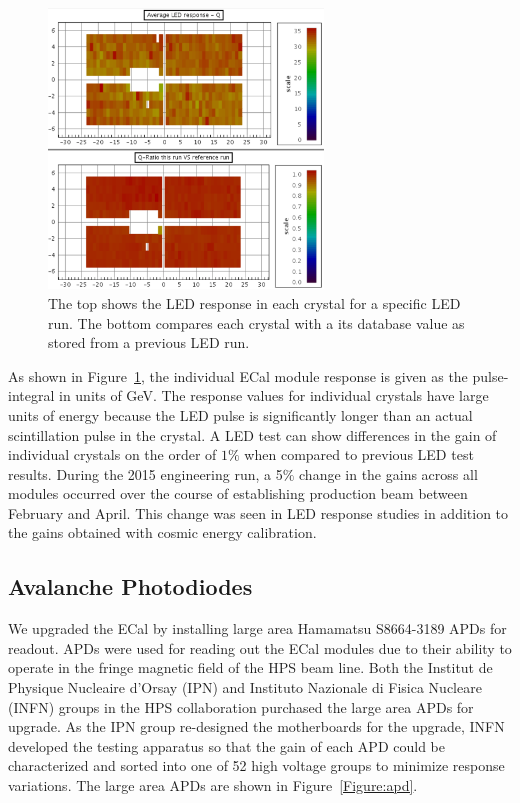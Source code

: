 \begin{figure}[htb]
  \centering
      \includegraphics[width=0.65\textwidth]{pics/experiment/ledCompare.png}
  \caption[Results of a single LED run]{The top shows the LED response in each crystal for a specific LED run. The bottom compares each crystal with a its database value as stored from a previous LED run.}
  \label{Figure:redCompare}
\end{figure}
As shown in Figure~\ref{Figure:redCompare}, the individual ECal module response is given as the pulse-integral in units of GeV. The response values for individual crystals have large units of energy because the LED pulse is significantly longer than an actual scintillation pulse in the crystal. A LED test can show differences in the gain of individual crystals on the order of $1\%$ when compared to previous LED test results. During the 2015 engineering run, a 5$\%$ change in the gains across all modules occurred over the course of establishing production beam between February and April. This change was seen in LED response studies in addition to the gains obtained with cosmic energy calibration.

\subsection{Avalanche Photodiodes}


We upgraded the ECal by installing large area Hamamatsu S8664-3189 APDs for readout. APDs were used for reading out the ECal modules due to their ability to operate in the fringe magnetic field of the HPS beam line. Both the Institut de Physique Nucleaire d'Orsay (IPN) and Instituto Nazionale di Fisica Nucleare (INFN) groups in the HPS collaboration purchased the large area APDs for upgrade. As the IPN group re-designed the motherboards for the upgrade, INFN developed the testing apparatus so that the gain of each APD could be characterized and sorted into one of 52 high voltage groups to minimize response variations. The large area APDs are shown in Figure~\ref{Figure:apd}.


